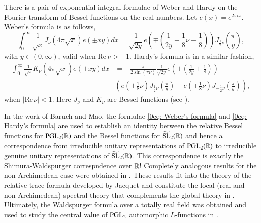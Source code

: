 \documentclass{amsproc}
\newcommand{\SL}{{\mathrm {SL}}} \newcommand{\PSL}{{\mathrm {PSL}}}
\def\lp {\left (}
\def\rp {\right )}
\renewcommand{\Re}{{\mathrm{Re}\,}}
\theoremstyle{plain}
\numberwithin{equation}{section}
\begin{document}
	There is a pair of exponential integral formulae of Weber and Hardy on the Fourier transform of Bessel functions on the real numbers. Let $e (x) = e^{2 \pi i x}$.
	Weber's formula   is as follows,
	\begin{equation}\label{0eq: Weber's formula}
	\int_0^\infty \frac 1 {\sqrt x}  J_{\nu} \lp 4 \pi \sqrt x\rp e \lp {\pm x y} \rp   {d x}  = \frac 1 {\sqrt {2 y} } e \lp {\mp  \lp \frac 1 {2 y} - \frac 1 8  \nu - \frac 1 8 \rp} \rp J_{\frac 1 2 \nu} \lp \frac {\pi} y \rp,
	\end{equation}
	with $y \in (0, \infty)$, valid when  $\Re \nu > - 1$.  Hardy's formula  is in a similar fashion,
	\begin{equation}\label{0eq: Hardy's formula}
	\begin{split}
	\int_0^\infty \frac 1 {\sqrt x}  K_{\nu} \lp 4 \pi \sqrt x\rp e \lp {\pm x y} \rp   {d x} & =   - \frac {\pi} {2 \sin ( \pi \nu)}  \frac 1 {\sqrt {2 y} } e \lp {\pm  \lp \frac 1 {2 y} + \frac 1 8 \rp} \rp \\
	& \lp e \lp \pm \frac 1 8 \nu \rp J_{\frac 1 2 \nu} \lp \frac {\pi} y \rp -
	e \lp \mp \frac 1 8 \nu \rp J_{- \frac 1 2 \nu} \lp \frac {\pi} y \rp \rp,
	\end{split}
	\end{equation}
	when $|\Re \nu | < 1$. Here $J_{\nu}$ and $K_{\nu}$ are  Bessel functions (see \cite{Watson}).
	
	In the work  \cite{BaruchMao-Real} of Baruch and Mao, the formulae \eqref{0eq: Weber's formula} and \eqref{0eq: Hardy's formula} are used to establish an identity between the relative Bessel functions for $ {\mathrm {PGL}}_2 ({\mathbb {R}})  $ and the Bessel functions for $\widetilde {\SL}_2 (\BR)$ and hence a correspondence from  irreducible unitary representations of ${\mathrm {PGL}}_2 ({\mathbb {R}})$ to  irreducible genuine unitary representations of $\widetilde {\SL}_2 (\BR)$. This correspondence is exactly the Shimura-Waldspurger correspndence over ${\mathbb {R}}$!
	Completely analogous results for the non-Archimedean case were  obtained in  \cite{BaruchMao-NA}. These results fit into the theory of the relative trace formula developed by
	Jacquet and constitute the local (real and non-Archimedean) spectral theory that complements the global theory in \cite{Jacquet-RTF}. Ultimately,  the Waldspurger formula over a totally real field was obtained and used to study the central
	value of ${\mathrm {PGL}}_2$ automorphic $L$-functions in \cite{BaruchMao-Global}.
	
\end{document}
